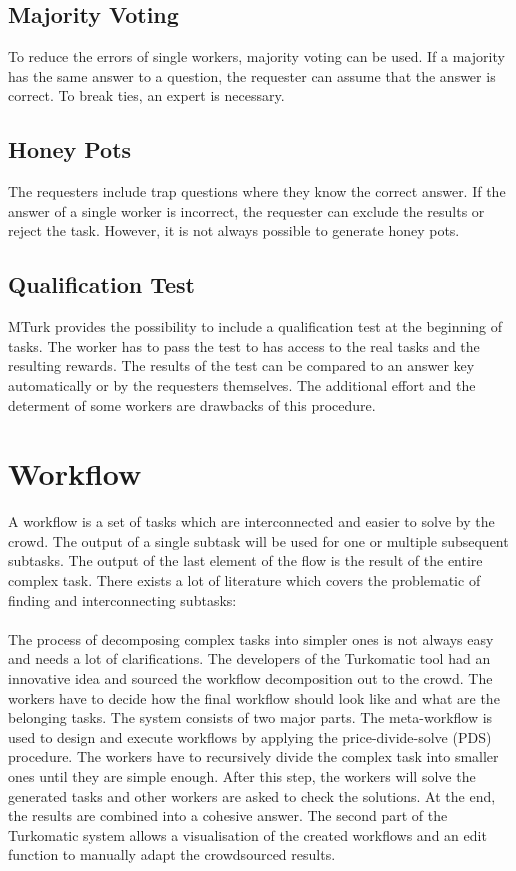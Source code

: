 \subsection{Majority Voting}
To reduce the errors of single workers, majority voting can be used. If a majority has the same answer to a question, the requester can assume that the answer is correct. To break ties, an expert is necessary. 
\subsection{Honey Pots}
\label{sub:honeypots}
The requesters include trap questions where they know the correct answer. If the answer of a single worker is incorrect, the requester can exclude the results or reject the task. However, it is not always possible to generate honey pots. 
\subsection{Qualification Test}
MTurk provides the possibility to include a qualification test at the beginning of tasks. The worker has to pass the test to has access to the real tasks and the resulting rewards. The results of the test can be compared to an answer key automatically or by the requesters themselves. The additional effort and the determent of some workers are drawbacks of this procedure.

\section{Workflow}
A workflow is a set of tasks which are interconnected and easier to solve by the crowd. The output of a single subtask will be used for one or multiple subsequent subtasks. The output of the last element of the flow is the result of the entire complex task. There exists a lot of literature which covers the problematic of finding and interconnecting subtasks:\\\\
The process of decomposing complex tasks into simpler ones is not always easy and needs a lot of clarifications. The developers of the Turkomatic\cite{turkomatic} tool had an innovative idea and sourced the workflow decomposition out to the crowd. The workers have to decide how the final workflow should look like and what are the belonging tasks. The system consists of two major parts. The meta-workflow is used to design and execute workflows by applying the price-divide-solve (PDS) procedure. The workers have to recursively divide the complex task into smaller ones until they are simple enough. After this step, the workers will solve the generated tasks and other workers are asked to check the solutions. At the end, the results are combined into a cohesive answer. The second part of the Turkomatic system allows a visualisation of the created workflows and an edit function to manually adapt the crowdsourced results.

